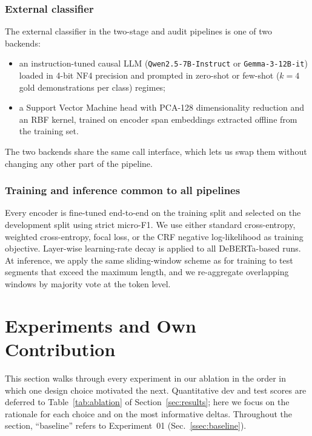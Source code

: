 \documentclass[journal]{IEEEtran}
\begin{document}
\subsubsection{External classifier}
The external classifier in the two-stage and audit pipelines is one
of two backends:
\begin{itemize}
\item an instruction-tuned causal LLM
(\texttt{Qwen2.5-7B-Instruct} or \texttt{Gemma-3-12B-it}) loaded in
4-bit NF4 precision and prompted in zero-shot or few-shot
($k{=}4$ gold demonstrations per class) regimes;
\item a Support Vector Machine head with PCA-128 dimensionality
reduction and an RBF kernel, trained on encoder span embeddings
extracted offline from the training set.
\end{itemize}
The two backends share the same call interface, which lets us swap
them without changing any other part of the pipeline.

\subsubsection{Training and inference common to all pipelines}
Every encoder is fine-tuned end-to-end on the training split and
selected on the development split using strict micro-F1. We use
either standard cross-entropy, weighted cross-entropy, focal loss, or
the CRF negative log-likelihood as training objective. Layer-wise
learning-rate decay is applied to all DeBERTa-based runs. At
inference, we apply the same sliding-window scheme as for training to
test segments that exceed the maximum length, and we re-aggregate
overlapping windows by majority vote at the token level.

\section{Experiments and Own Contribution}
\label{sec:experiments}
This section walks through every experiment in our ablation in the
order in which one design choice motivated the next. Quantitative dev
and test scores are deferred to Table~\ref{tab:ablation} of
Section~\ref{sec:results}; here we focus on the rationale for each
choice and on the most informative deltas. Throughout the section,
``baseline'' refers to Experiment~01 (Sec.~\ref{ssec:baseline}).
\end{document}
